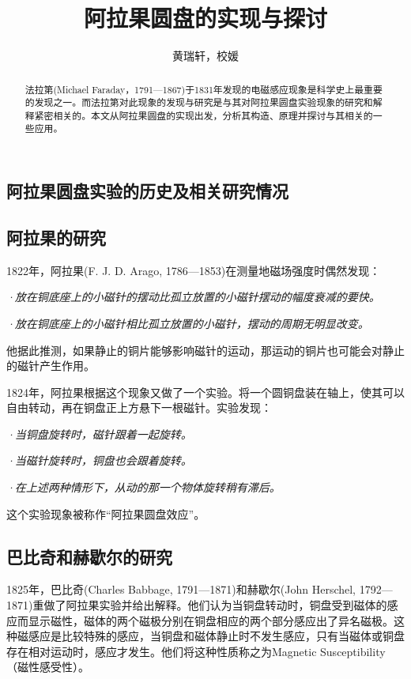 \documentclass{CLGPY}
\title[阿拉果圆盘的实现与探讨]{阿拉果圆盘的实现与探讨}
\author[黄瑞轩，校媛]{黄瑞轩，校媛}
\institute{({中国科学技术大学{\kern.5\ccwd} 计算机科学与技术学院，安徽{\kern.5\ccwd}合肥})}
\begin{document}
    \maketitle

    \begin{abstract}%
        法拉第(Michael Faraday，1791—1867)于1831年发现的电磁感应现象是科学史上最重要的发现之一。而法拉第对此现象的发现与研究是与其对阿拉果圆盘实验现象的研究和解释紧密相关的。本文从阿拉果圆盘的实现出发，分析其构造、原理并探讨与其相关的一些应用。
    \end{abstract}

    \begin{multicols}{1}

        \section{阿拉果圆盘实验的历史及相关研究情况}
        \subsection{阿拉果的研究}
        1822年，阿拉果(F. J. D. Arago, 1786—1853)在测量地磁场强度时偶然发现：

\emph{·放在铜底座上的小磁针的摆动比孤立放置的小磁针摆动的幅度衰减的要快。}

\emph{·放在铜底座上的小磁针相比孤立放置的小磁针，摆动的周期无明显改变。}

他据此推测，如果静止的铜片能够影响磁针的运动，那运动的铜片也可能会对静止的磁针产生作用。

        1824年，阿拉果根据这个现象又做了一个实验。将一个圆铜盘装在轴上，使其可以自由转动，再在铜盘正上方悬下一根磁针。实验发现：

\emph{·当铜盘旋转时，磁针跟着一起旋转。}

\emph{·当磁针旋转时，铜盘也会跟着旋转。}

\emph{·在上述两种情形下，从动的那一个物体旋转稍有滞后。}

这个实验现象被称作“阿拉果圆盘效应”。
        \subsection{巴比奇和赫歇尔的研究}
1825年，巴比奇(Charles Babbage, 1791—1871)和赫歇尔(John Herschel, 1792—1871)重做了阿拉果实验并给出解释。他们认为当铜盘转动时，铜盘受到磁体的感应而显示磁性，磁体的两个磁极分别在铜盘相应的两个部分感应出了异名磁极。这种磁感应是比较特殊的感应，当铜盘和磁体静止时不发生感应，只有当磁体或铜盘存在相对运动时，感应才发生。他们将这种性质称之为Magnetic Susceptibility（磁性感受性）。


\end{multicols}
\end{document}

